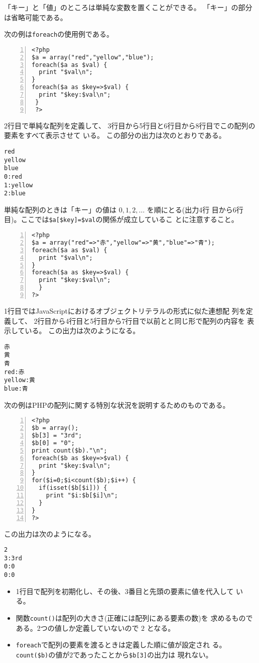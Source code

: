 「キー」と「値」のところは単純な変数を置くことができる。
「キー」の部分は省略可能である。
\begin{Exec}\upshape
 次の例は\texttt{foreach}の使用例である。
\begin{Verbatim}[numbers=left]
 <?php
$a = array("red","yellow","blue");
foreach($a as $val) {
  print "$val\n";
}
foreach($a as $key=>$val) {
  print "$key:$val\n";
 }
 ?>
\end{Verbatim}
 2行目で単純な配列を定義して、
 3行目から5行目と6行目から8行目でこの配列の要素をすべて表示させて
       いる。
この部分の出力は次のとおりである。
\begin{verbatim}
red
yellow
blue
0:red
1:yellow
2:blue
\end{verbatim}
 単純な配列のときは「キー」の値は $0,1,2,\dots$ を順にとる(出力4行
       目から6行目)。ここでは\Verb+$a[$key]=$val+の関係が成立しているこ
       とに注意すること。
 \begin{Verbatim}[numbers=left]
<?php
$a = array("red"=>"赤","yellow"=>"黄","blue"=>"青");
foreach($a as $val) {
  print "$val\n";
}
foreach($a as $key=>$val) {
  print "$key:$val\n";
  }
?>
\end{Verbatim}
 1行目ではJavaScriptにおけるオブジェクトリテラルの形式に似た連想配
       列を定義して、 2行目から4行目と5行目から7行目で以前とと同じ形で配列の内容を
       表示している。
この出力は次のようになる。
\begin{Verbatim}
赤
黄
青
red:赤
yellow:黄
blue:青
\end{Verbatim}
\end{Exec}%
\begin{Exec}\upshape
次の例はPHPの配列に関する特別な状況を説明するためのものである。
\begin{Verbatim}[numbers=left]
<?php
$b = array();
$b[3] = "3rd";
$b[0] = "0";
print count($b)."\n";
foreach($b as $key=>$val) {
  print "$key:$val\n";
}
for($i=0;$i<count($b);$i++) {
  if(isset($b[$i])) {
    print "$i:$b[$i]\n";
  }
}
?>
\end{Verbatim}
この出力は次のようになる。%
\begin{Verbatim}
2
3:3rd
0:0
0:0
\end{Verbatim}
\begin{itemize}\upshape
 \item 1行目で配列を初期化し、その後、$3$番目と先頭の要素に値を代入して
       いる。
 \item 関数\texttt{count()}は配列の大きさ(正確には配列にある要素の数)を
       求めるものである。2つの値しか定義していないので $2$ となる。
 \item \texttt{foreach}で配列の要素を渡るときは定義した順に値が設定され
       る。\Verb+count($b)+の値が$2$であったことから\Verb+$b[3]+の出力は
       現れない。
\end{itemize}
 \end{Exec}

